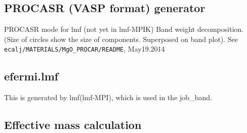 \documentclass[a4paper,10pt,epsf,fleqn]{article}
\begin{document}
\subsection{PROCASR (VASP format) generator}
PROCASR mode for lmf (not yet in lmf-MPIK)
Band weight decomposition. 
(Size of circles show the size of components. Superposed on band
plot). See \verb#ecalj/MATERIALS/MgO_PROCAR/README#, May19.2014


\subsection{efermi.lmf}
This is generated by lmf(lmf-MPI), which is used in the job\_band.


\subsection{Effective mass calculation}
\end{document}
